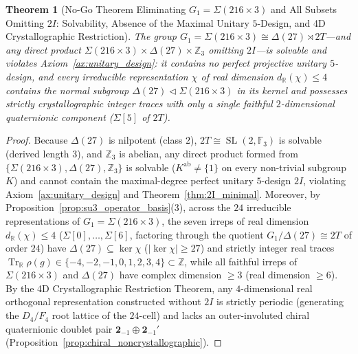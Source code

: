 \documentclass[11pt,a4paper]{article}
\newtheorem{theorem}{Theorem}[section]
\theoremstyle{definition}
\theoremstyle{remark}
\newcommand{\R}{\mathbb{R}}
\newcommand{\Z}{\mathbb{Z}}
\newcommand{\F}{\mathbb{F}}
\newcommand{\Tr}{\operatorname{Tr}}
\newcommand{\SL}{\operatorname{SL}}
\begin{document}
\begin{theorem}[No-Go Theorem Eliminating $G_1 = \Sigma(216 \times 3)$ and All Subsets Omitting $2I$: Solvability, Absence of the Maximal Unitary $5$-Design, and 4D Crystallographic Restriction]
\label{thm:nogo1}
The group $G_1 = \Sigma(216 \times 3) \cong \Delta(27) \rtimes 2T$---and any direct product $\Sigma(216 \times 3) \times \Delta(27) \times \Z_3$ omitting $2I$---is solvable and violates Axiom~\ref{ax:unitary_design}: it contains no perfect projective unitary $5$-design, and every irreducible representation $\chi$ of real dimension $d_{\R}(\chi) \le 4$ contains the normal subgroup $\Delta(27) \triangleleft \Sigma(216 \times 3)$ in its kernel and possesses strictly crystallographic integer traces with only a single faithful $2$-dimensional quaternionic component ($\Sigma[5]$ of $2T$).
\end{theorem}

\begin{proof}
Because $\Delta(27)$ is nilpotent (class $2$), $2T \cong \SL(2,\F_3)$ is solvable (derived length $3$), and $\Z_3$ is abelian, any direct product formed from $\{\Sigma(216 \times 3), \Delta(27), \Z_3\}$ is solvable ($K^{\mathrm{ab}} \neq \{1\}$ on every non-trivial subgroup $K$) and cannot contain the maximal-degree perfect unitary $5$-design $2I$, violating Axiom~\ref{ax:unitary_design} and Theorem~\ref{thm:2I_minimal}. Moreover, by Proposition~\ref{prop:su3_operator_basis}(3), across the $24$ irreducible representations of $G_1 = \Sigma(216 \times 3)$, the seven irreps of real dimension $d_{\R}(\chi) \le 4$ ($\Sigma[0], \dots, \Sigma[6]$, factoring through the quotient $G_1 / \Delta(27) \cong 2T$ of order $24$) have $\Delta(27) \subseteq \ker\chi$ ($|\ker\chi| \ge 27$) and strictly integer real traces $\Tr_{\R}\rho(g) \in \{-4,-2,-1,0,1,2,3,4\} \subset \Z$, while all faithful irreps of $\Sigma(216 \times 3)$ and $\Delta(27)$ have complex dimension $\ge 3$ (real dimension $\ge 6$). By the 4D Crystallographic Restriction Theorem, any $4$-dimensional real orthogonal representation constructed without $2I$ is strictly periodic (generating the $D_4/F_4$ root lattice of the $24$-cell) and lacks an outer-involuted chiral quaternionic doublet pair $\mathbf{2}_{-1} \oplus \mathbf{2}_{-1}'$ (Proposition~\ref{prop:chiral_noncrystallographic}).
\end{proof}
\end{document}
